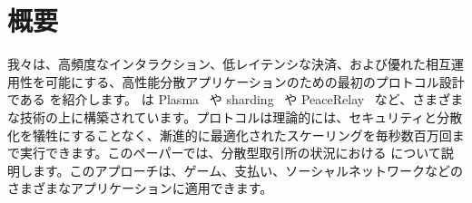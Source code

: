 \section*{概要}

我々は、高頻度なインタラクション、低レイテンシな決済、および優れた相互運用性を可能にする、高性能分散アプリケーションのための最初のプロトコル設計である \codename を紹介します。 \codename は Plasma~\cite{plasma} や sharding~ \cite{elastico} や PeaceRelay~\cite{peacerelay} など、さまざまな技術の上に構築されています。プロトコルは理論的には、セキュリティと分散化を犠牲にすることなく、漸進的に最適化されたスケーリングを毎秒数百万回まで実行できます。このペーパーでは、分散型取引所の状況における \codename について説明します。このアプローチは、ゲーム、支払い、ソーシャルネットワークなどのさまざまなアプリケーションに適用できます。

